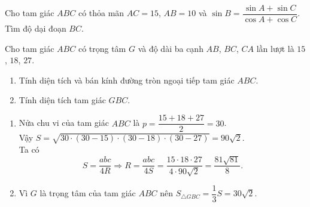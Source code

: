 \begin{ex}%
Cho tam giác $ABC$ có thỏa mãn $AC=15$, $AB=10$ và $\sin B=\dfrac{\sin A+\sin C}{\cos A+\cos C}$. Tìm độ dại đoạn $BC$.
\end{ex}
\begin{ex}
	Cho tam giác $ABC$ có trọng tâm $G$ và độ dài ba cạnh $AB$, $BC$, $CA$ lần lượt là $15$, $18$, $27$.
	\begin{enumerate}
		\item Tính diện tích và bán kính đường tròn ngoại tiếp tam giác $ABC$.
		\item Tính diện tích tam giác $GBC$.
	\end{enumerate}
	\loigiai
	{
		\begin{enumerate}
			\item %
			 Nửa chu vi của tam giác $ABC$ là $p=\dfrac{15+18+27}{2}=30$.\\
			 Vậy $S=\sqrt{30\cdot (30-15)\cdot (30-18)\cdot (30-27)}=90\sqrt{2}$.\\
			 Ta có
			 $$S=\dfrac{abc}{4R}\Rightarrow R=\dfrac{abc}{4S}=\dfrac{15\cdot 18 \cdot 27}{4 \cdot 90\sqrt{2}}=\dfrac{81\sqrt{81}}{8}.$$
			\item %
			 Vì $G$ là trọng tâm của tam giác $ABC$ nên $S_{\triangle GBC}=\dfrac{1}{3}S=30\sqrt{2}$.
		\end{enumerate}
	}
\end{ex}

